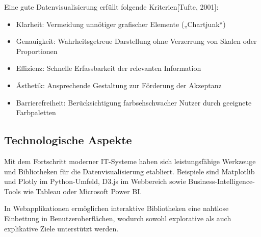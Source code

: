 Eine gute Datenvisualisierung erfüllt folgende Kriterien[Tufte, 2001]:


\begin{itemize}

\item
Klarheit: Vermeidung unnötiger grafischer Elemente („Chartjunk“)
\item
Genauigkeit: Wahrheitsgetreue Darstellung ohne Verzerrung von Skalen oder Proportionen
\item
Effizienz: Schnelle Erfassbarkeit der relevanten Information
\item
Ästhetik: Ansprechende Gestaltung zur Förderung der Akzeptanz
\item
Barrierefreiheit: Berücksichtigung farbsehschwacher Nutzer durch geeignete Farbpaletten

\end{itemize}

\subsection{Technologische Aspekte}

Mit dem Fortschritt moderner IT-Systeme haben sich leistungsfähige Werkzeuge und Bibliotheken für die Datenvisualisierung etabliert. Beispiele sind Matplotlib und Plotly im Python-Umfeld, D3.js im Webbereich sowie Business-Intelligence-Tools wie Tableau oder Microsoft Power BI.

In Webapplikationen ermöglichen interaktive Bibliotheken eine nahtlose Einbettung in Benutzeroberflächen, wodurch sowohl explorative als auch explikative Ziele unterstützt werden.

